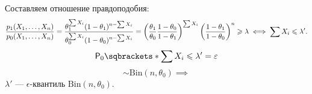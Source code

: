 \begin{example}
\begin{enumerate}
    Составляем отношение правдоподобия:
    \begin{displaymath}
        \frac{p_1(X_1, \ldots, X_n)}{p_0(X_1, \ldots, X_n)} = 
        \frac{\theta_1^{\sum X_i} (1 - \theta_1)^{n - \sum X_i}}{\theta_0^{\sum X_i} (1 - \theta_0)^{n - \sum X_i}} = 
        \left(\frac{\theta_1}{\theta_0} \frac{1 - \theta_0}{1 - \theta_1}\right)^{\sum X_i} \left(\frac{1 - \theta_1}{1 - \theta_0}\right)^n \geqslant \lambda \iff \sum X_i \leqslant \lambda'.
    \end{displaymath}
    \begin{displaymath}
        \PP[0]{\sum X_i \leq \lambda'} = \epsilon
    \end{displaymath}
    \begin{displaymath}
        \sim \mathrm{Bin}(n, \theta_0) \implies
    \end{displaymath}
    \(\lambda'\) --- \(\epsilon\)-квантиль \(\mathrm{Bin}(n, \theta_0)\).
    \end{enumerate}
\end{example}
